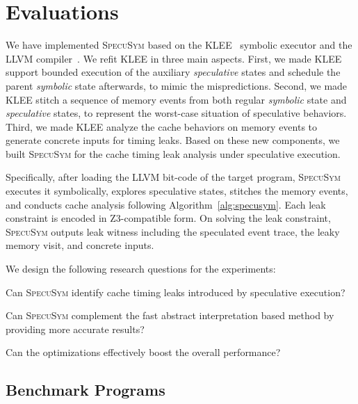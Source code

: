 \documentclass[sigconf]{acmart}
\newcommand{\SpecuSym}{\textsc{SpecuSym} }
\begin{document}
\section{Evaluations}
\label{sec:evaluation}


We have implemented \SpecuSym based on the KLEE~\cite{CadarDE08} symbolic 
executor and the LLVM compiler~\cite{LattnerA04}. We refit KLEE in three
main aspects. First, we made KLEE support bounded execution of the  
auxiliary \textit{speculative} states and schedule the parent \textit{symbolic} 
state afterwards, to mimic the mispredictions. Second, we made KLEE stitch 
a sequence of memory events from both regular \textit{symbolic} state and 
\textit{speculative} states, to represent the worst-case situation of 
speculative behaviors. Third, we made KLEE analyze the cache behaviors on 
memory events to generate concrete inputs for timing leaks. Based on these 
new components, we built \SpecuSym for the cache timing leak analysis 
under speculative execution.

Specifically, after loading the LLVM bit-code of the target program, \SpecuSym 
executes it symbolically, explores speculative states, stitches the memory 
events, and conducts cache analysis following Algorithm~\ref{alg:specusym}. 
Each leak constraint is encoded in Z3-compatible form. On solving the leak
constraint, \SpecuSym outputs leak witness including the speculated event 
trace, the leaky memory visit, and concrete inputs. 

We design the following research questions for the experiments: 
\begin{compactitem}
\item Can \SpecuSym identify cache timing leaks introduced 
by speculative execution?
\item Can \SpecuSym complement the fast abstract interpretation 
based method by providing more accurate results?
\item Can the optimizations effectively boost the overall performance?
\end{compactitem}



\subsection{Benchmark Programs}
\label{sec:benchs}
\end{document}
